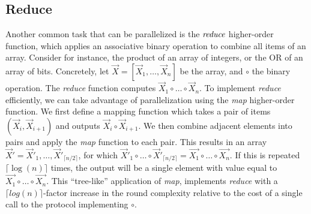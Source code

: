 \subsection{Reduce}
Another common task that can be parallelized is the $\emph{reduce}$
higher-order function, which applies an associative 
binary operation to combine all items of an array.
Consider for instance, the product of an array of integers,
or the OR of an array of bits.
Concretely, let $\vec{X} = [\vec{X}_1, \ldots, \vec{X}_n]$ be the array, 
and $\circ$ the binary operation.
The \emph{reduce} function computes $\vec{X}_1 \circ \ldots  \circ \vec{X}_n$.
To implement \emph{reduce} efficiently, 
we can take advantage of parallelization using the \textit{map} higher-order function.
We first define a mapping function which takes a pair of items 
$(\vec{X}_i, \vec{X}_{i+1})$ and outputs $\vec{X}_i \circ \vec{X}_{i+1}$.
We then combine adjacent elements into pairs and apply the \textit{map} function to each pair.
This results in an array $\vec{X}' = \vec{X}'_1, \ldots, \vec{X}'_{\lceil n/2 \rceil}$, 
for which $\vec{X}'_1 \circ \ldots \circ \vec{X}'_{\lceil n/2 \rceil} =
\vec{X_1} \circ \ldots  \circ \vec{X_n}$.
If this is repeated $\lceil \log(n) \rceil$ times, the output will be a single element
with value equal to $\vec{X_1} \circ \ldots  \circ \vec{X_n}$.
This ``tree-like'' application of \textit{map}, implements \textit{reduce} 
with a $\lceil log(n) \rceil$-factor increase in the round complexity
relative to the cost of a single call to the protocol implementing $\circ$.


